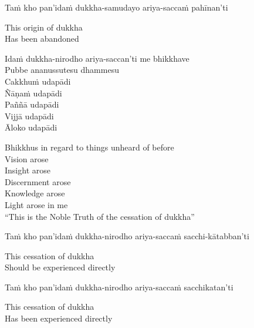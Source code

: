 \ifninebythirteen\clearpage\fi

\begin{pali-hang}
Taṁ kho pan'idaṁ dukkha-samudayo ariya-saccaṁ pahīnan'ti
\end{pali-hang}

\begin{english}
  This origin of dukkha\\
  Has been abandoned
\end{english}

\ifafive\clearpage\fi

Idaṁ dukkha-nirodho ariya-saccan'ti me bhikkhave\\
Pubbe ananussutesu dhammesu\\
Cakkhuṁ udapādi\\
Ñāṇaṁ udapādi\\
Paññā udapādi\\
Vijjā udapādi\\
Āloko udapādi

\begin{english-verses}
  Bhikkhus in regard to things unheard of before\\
  Vision arose\\
  Insight arose\\
  Discernment arose\\
  Knowledge arose\\
  Light arose in me\\
  ``This is the Noble Truth of the cessation of dukkha''
\end{english-verses}

\begin{pali-hang}
Taṁ kho pan'idaṁ dukkha-nirodho ariya-saccaṁ sacchi-kātabban'ti
\end{pali-hang}

\begin{english}
  This cessation of dukkha\\
  Should be experienced directly
\end{english}

\ifninebythirteen\clearpage\fi

\begin{pali-hang}
  Taṁ kho pan'idaṁ dukkha-nirodho ariya-saccaṁ sacchikatan'ti
\end{pali-hang}

\begin{english}
  This cessation of dukkha\\
  Has been experienced directly
\end{english}

